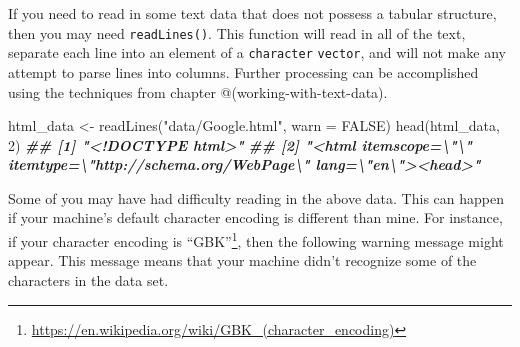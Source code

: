 \documentclass[
  12pt,
  krantz2]{krantz}
\makeatletter
\newenvironment{Shaded}{\begin{snugshade}}{\end{snugshade}}
\newcommand{\AttributeTok}[1]{\textcolor[rgb]{0.61,0.61,0.61}{#1}}
\newcommand{\CommentTok}[1]{\textcolor[rgb]{0.37,0.37,0.37}{\textit{#1}}}
\newcommand{\ConstantTok}[1]{\textcolor[rgb]{0,0,0}{#1}}
\newcommand{\DecValTok}[1]{\textcolor[rgb]{0.06,0.06,0.06}{#1}}
\newcommand{\DocumentationTok}[1]{\textcolor[rgb]{0.37,0.37,0.37}{\textbf{\textit{#1}}}}
\newcommand{\FunctionTok}[1]{\textcolor[rgb]{0,0,0}{#1}}
\newcommand{\NormalTok}[1]{#1}
\newcommand{\OtherTok}[1]{\textcolor[rgb]{0.37,0.37,0.37}{#1}}
\newcommand{\StringTok}[1]{\textcolor[rgb]{0.5,0.5,0.5}{#1}}
\renewcommand{\href}[2]{#2\footnote{\url{#1}}}
\newenvironment{kframe}{%
\medskip{}
\setlength{\fboxsep}{.8em}
 \def\at@end@of@kframe{}%
 \ifinner\ifhmode%
  \def\at@end@of@kframe{\end{minipage}}%
  \begin{minipage}{\columnwidth}%
 \fi\fi%
 \def\FrameCommand##1{\hskip\@totalleftmargin \hskip-\fboxsep
 \colorbox{shadecolor}{##1}\hskip-\fboxsep
     \hskip-\linewidth \hskip-\@totalleftmargin \hskip\columnwidth}%
 \MakeFramed {\advance\hsize-\width
   \@totalleftmargin\z@ \linewidth\hsize
   \@setminipage}}%
 {\par\unskip\endMakeFramed%
 \at@end@of@kframe}
\renewenvironment{Shaded}{\begin{kframe}}{\end{kframe}}
\makeatother
\begin{document}
\begin{Shaded}
\end{Shaded}

If you need to read in some text data that does not possess a tabular structure, then you may need \texttt{readLines()}. This function will read in all of the text, separate each line into an element of a \texttt{character} \texttt{vector}, and will not make any attempt to parse lines into columns. Further processing can be accomplished using the techniques from chapter @(working-with-text-data).

\begin{Shaded}
\begin{Highlighting}[]
\NormalTok{html\_data }\OtherTok{\textless{}{-}} \FunctionTok{readLines}\NormalTok{(}\StringTok{"data/Google.html"}\NormalTok{, }\AttributeTok{warn =} \ConstantTok{FALSE}\NormalTok{)}
\FunctionTok{head}\NormalTok{(html\_data, }\DecValTok{2}\NormalTok{)}
\DocumentationTok{\#\# [1] "\textless{}!DOCTYPE html\textgreater{}"                                                               }
\DocumentationTok{\#\# [2] "\textless{}html itemscope=\textbackslash{}"\textbackslash{}" itemtype=\textbackslash{}"http://schema.org/WebPage\textbackslash{}" lang=\textbackslash{}"en\textbackslash{}"\textgreater{}\textless{}head\textgreater{}"}
\end{Highlighting}
\end{Shaded}

Some of you may have had difficulty reading in the above data. This can happen if your machine's default character encoding is different than mine. For instance, if your character encoding is \href{https://en.wikipedia.org/wiki/GBK_(character_encoding)}{``GBK''}, then the following warning message might appear. This message means that your machine didn't recognize some of the characters in the data set.
\end{document}
